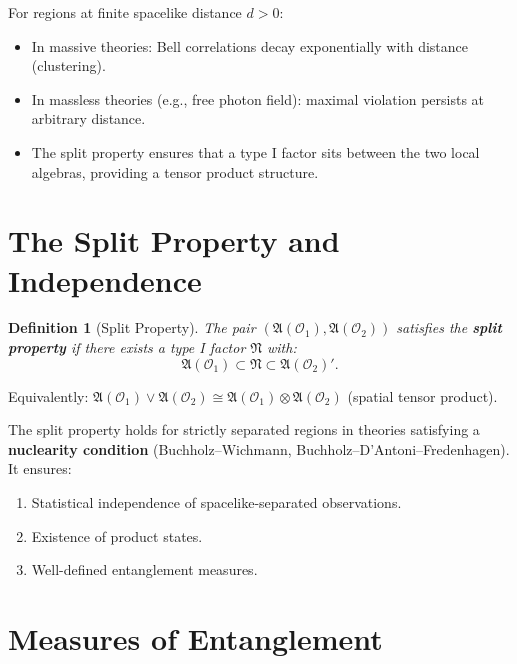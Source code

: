 \documentclass[11pt,a4paper]{article}
\newtheorem{definition}{Definition}[section]
\begin{document}
For regions at finite spacelike distance $d > 0$:
\begin{itemize}[nosep]
  \item In massive theories: Bell correlations decay exponentially with
        distance (clustering).
  \item In massless theories (e.g., free photon field): maximal violation
        persists at arbitrary distance.
  \item The split property ensures that a type I factor sits between
        the two local algebras, providing a tensor product structure.
\end{itemize}

\section{The Split Property and Independence}

\begin{definition}[Split Property]
The pair $(\mathfrak{A}(\mathcal{O}_1), \mathfrak{A}(\mathcal{O}_2))$
satisfies the \textbf{split property} if there exists a type I factor
$\mathfrak{N}$ with:
\begin{equation}
  \mathfrak{A}(\mathcal{O}_1) \subset \mathfrak{N} \subset
  \mathfrak{A}(\mathcal{O}_2)'.
\end{equation}
\end{definition}

Equivalently: $\mathfrak{A}(\mathcal{O}_1) \vee \mathfrak{A}(\mathcal{O}_2)
\cong \mathfrak{A}(\mathcal{O}_1) \otimes \mathfrak{A}(\mathcal{O}_2)$
(spatial tensor product).

The split property holds for strictly separated regions in theories satisfying
a \textbf{nuclearity condition} (Buchholz--Wichmann, Buchholz--D'Antoni--Fredenhagen).
It ensures:
\begin{enumerate}[nosep]
  \item Statistical independence of spacelike-separated observations.
  \item Existence of product states.
  \item Well-defined entanglement measures.
\end{enumerate}

\section{Measures of Entanglement}
\end{document}
